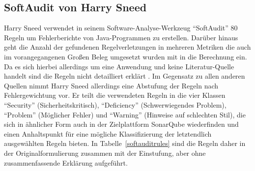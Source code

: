 \documentclass[da,ngerman]{stthesis}
\begin{document}
			\subsection{SoftAudit von Harry Sneed}
				Harry Sneed verwendet in seinem Software-Analyse-Werkzeug "`SoftAudit"' 80 Regeln um Fehlerberichte von Java-Programmen zu erstellen. Darüber hinaus geht die Anzahl der gefundenen Regelverletzungen in mehreren Metriken die auch im vorangegangenen Großen Beleg umgesetzt wurden \cite{grosserBeleg} mit in die Berechnung ein. Da es sich hierbei allerdings um eine Anwendung und keine Literatur-Quelle handelt sind die Regeln nicht detailliert erklärt \cite{SoftAuditDoku}. Im Gegensatz zu allen anderen Quellen nimmt Harry Sneed allerdings eine Abstufung der Regeln nach Fehlergewichtung vor. Er teilt die verwendeten Regeln in die vier Klassen "`Security"' (Sicherheitskritisch), "`Deficiency"' (Schwerwiegendes Problem), "`Problem"' (Möglicher Fehler) und "`Warning"' (Hinweise auf schlechten Stil), die sich in ähnlicher Form auch in der Zielplattform SonarQube wiederfinden und einen Anhaltspunkt für eine mögliche Klassifizierung der letztendlich ausgewählten Regeln bieten. In Tabelle~\ref{softauditrules} sind die Regeln daher in der Originalformulierung zusammen mit der Einstufung, aber ohne zusammenfassende Erklärung aufgeführt.
\end{document}
